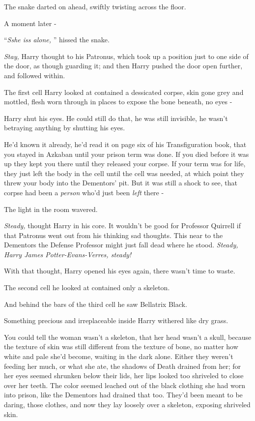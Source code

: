 The snake darted on ahead, swiftly twisting across the floor.

A moment later -

``\emph{Sshe iss alone,} '' hissed the snake.

\emph{Stay,} Harry thought to his Patronus, which took up a position
just to one side of the door, as though guarding it; and then Harry
pushed the door open further, and followed within.

The first cell Harry looked at contained a dessicated corpse, skin gone
grey and mottled, flesh worn through in places to expose the bone
beneath, no eyes -

Harry shut his eyes. He could still do that, he was still invisible, he
wasn't betraying anything by shutting his eyes.

He'd known it already, he'd read it on page six of his Transfiguration
book, that you stayed in Azkaban until your prison term was done. If you
died before it was up they kept you there until they released your
corpse. If your term was for life, they just left the body in the cell
until the cell was needed, at which point they threw your body into the
Dementors' pit. But it was still a shock to see, that corpse had been a
\emph{person} who'd just been \emph{left} there -

The light in the room wavered.

\emph{Steady,} thought Harry in his core. It wouldn't be good for
Professor Quirrell if that Patronus went out from his thinking sad
thoughts. This near to the Dementors the Defense Professor might just
fall dead where he stood. \emph{Steady, Harry James Potter-Evans-Verres,
steady!}

With that thought, Harry opened his eyes again, there wasn't time to
waste.

The second cell he looked at contained only a skeleton.

And behind the bars of the third cell he saw Bellatrix Black.

Something precious and irreplaceable inside Harry withered like dry
grass.

You could tell the woman wasn't a skeleton, that her head wasn't a
skull, because the texture of skin was still different from the texture
of bone, no matter how white and pale she'd become, waiting in the dark
alone. Either they weren't feeding her much, or what she ate, the
shadows of Death drained from her; for her eyes seemed shrunken below
their lids, her lips looked too shriveled to close over her teeth. The
color seemed leached out of the black clothing she had worn into prison,
like the Dementors had drained that too. They'd been meant to be daring,
those clothes, and now they lay loosely over a skeleton, exposing
shriveled skin.

